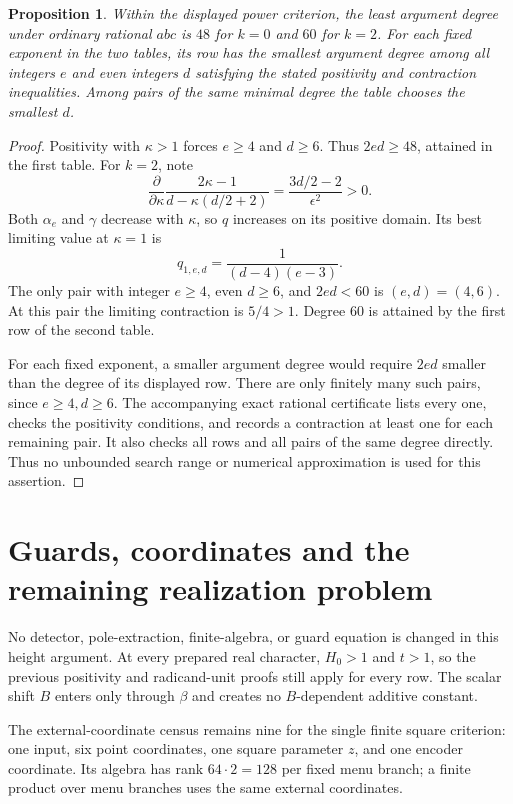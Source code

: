 \documentclass[11pt,a4paper]{article}
\newtheorem{proposition}[theorem]{Proposition}
\begin{document}
\begin{proposition}\label{prop:optimal}
Within the displayed power criterion, the least argument degree
under ordinary rational $abc$ is $48$ for $k=0$ and $60$ for $k=2$.
For each fixed exponent in the two tables, its row has the smallest
argument degree among all integers $e$ and even integers $d$ satisfying
the stated positivity and contraction inequalities. Among pairs of
the same minimal degree the table chooses the smallest $d$.
\end{proposition}
\begin{proof}
Positivity with $\kappa>1$ forces $e\ge4$ and $d\ge6$.
Thus $2ed\ge48$, attained in the first table.
For $k=2$, note
\[
 \frac{\partial}{\partial\kappa}
 \frac{2\kappa-1}{d-\kappa(d/2+2)}
 =\frac{3d/2-2}{\epsilon^2}>0.
\]
Both $\alpha_e$ and $\gamma$ decrease with $\kappa$, so $q$
increases on its positive domain. Its best limiting value at
$\kappa=1$ is
\[
 q_{1,e,d}=\frac1{(d-4)(e-3)}.
\]
The only pair with integer $e\ge4$, even $d\ge6$, and $2ed<60$ is
$(e,d)=(4,6)$. At this pair the limiting contraction is $5/4>1$.
Degree $60$ is attained by the first row of the second table.

For each fixed exponent, a smaller argument degree would require
$2ed$ smaller than the degree of its displayed row. There are only
finitely many such pairs, since $e\ge4,d\ge6$. The accompanying
exact rational certificate lists every one, checks the positivity
conditions, and records a contraction at least one for each remaining
pair. It also checks all rows and all pairs of the same degree
directly. Thus no unbounded search
range or numerical approximation is used for this assertion.
\end{proof}

\section{Guards, coordinates and the remaining realization problem}

No detector, pole-extraction, finite-algebra, or guard equation is
changed in this height argument. At every prepared real character,
$H_0>1$ and $t>1$, so the previous positivity and radicand-unit
proofs still apply for every row. The scalar shift $B$ enters only
through $\beta$ and creates no $B$-dependent additive constant.

The external-coordinate census remains nine for the single finite
square criterion: one input, six point coordinates, one square
parameter $z$, and one encoder coordinate. Its algebra has rank
$64\cdot2=128$ per fixed menu branch; a finite product over menu
branches uses the same external coordinates.
\end{document}
